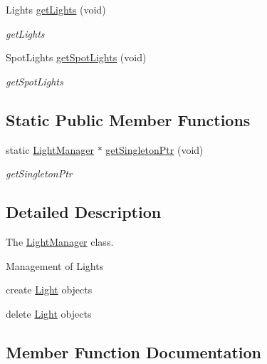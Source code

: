 \begin{DoxyCompactItemize}
\item 
Lights \hyperlink{classEngine_1_1LightManager_af8b211420f10d9b29d72114a69ce5175}{get\+Lights} (void)
\begin{DoxyCompactList}\small\item\em get\+Lights \end{DoxyCompactList}\item 
Spot\+Lights \hyperlink{classEngine_1_1LightManager_a3e0b088762961ea2f94d56f78ed2ee8c}{get\+Spot\+Lights} (void)
\begin{DoxyCompactList}\small\item\em get\+Spot\+Lights \end{DoxyCompactList}\end{DoxyCompactItemize}
\subsection*{Static Public Member Functions}
\begin{DoxyCompactItemize}
\item 
static \hyperlink{classEngine_1_1LightManager}{Light\+Manager} $\ast$ \hyperlink{classEngine_1_1LightManager_a875c588f08141aca1aff38ae0a1c1b1e}{get\+Singleton\+Ptr} (void)
\begin{DoxyCompactList}\small\item\em get\+Singleton\+Ptr \end{DoxyCompactList}\end{DoxyCompactItemize}


\subsection{Detailed Description}
The \hyperlink{classEngine_1_1LightManager}{Light\+Manager} class. 

Management of Lights


\begin{DoxyItemize}
\item create \hyperlink{classEngine_1_1Light}{Light} objects
\item delete \hyperlink{classEngine_1_1Light}{Light} objects 
\end{DoxyItemize}

\subsection{Member Function Documentation}
\hypertarget{classEngine_1_1LightManager_a1fc44ab503b283155ca0541e033380bd}{}

